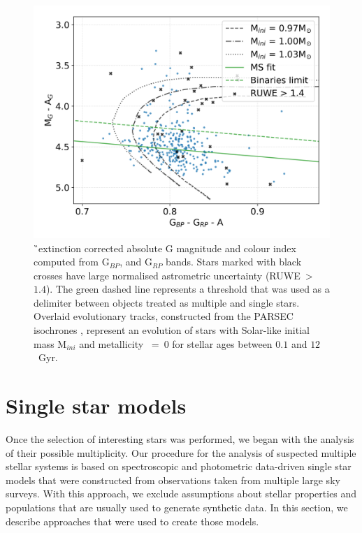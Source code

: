 \begin{figure}
	\centering
	\includegraphics[width=\columnwidth]{mag_hr_gaia_bin-multi_evol_mh000_nores_ebv_c3_07.png}
	\caption{\G\ extinction corrected absolute G magnitude and colour index computed from G$_{BP}$, and G$_{RP}$ bands. Stars marked with black crosses have large normalised astrometric uncertainty (RUWE~>~$1.4$). The green dashed line represents a threshold that was used as a delimiter between objects treated as multiple and single stars. Overlaid evolutionary tracks, constructed from the PARSEC isochrones \citep{2017ApJ...835...77M}, represent an evolution of stars with Solar-like initial mass M$_{ini}$ and metallicity \Mh~=~0 for stellar ages between $0.1$ and $12$~Gyr.}
	\label{fig:gabs_colour}
\end{figure}


\section{Single star models}
\label{sec:models_all}
Once the selection of interesting stars was performed, we began with the analysis of their possible multiplicity. Our procedure for the analysis of suspected multiple stellar systems is based on spectroscopic and photometric data-driven single star models that were constructed from observations taken from multiple large sky surveys. With this approach, we exclude assumptions about stellar properties and populations that are usually used to generate synthetic data. In this section, we describe approaches that were used to create those models.


